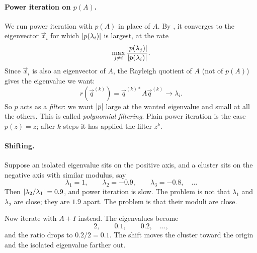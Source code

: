 \paragraph{Power iteration on \texorpdfstring{$p(A)$}{p(A)}.} We run power iteration with $p(A)$ in place of $A$. By , it converges to the eigenvector $\vec{x}_i$ for which $\left\lvert p(\lambda_i) \right\rvert$ is largest, at the rate
\begin{equation*}
  \max_{j \ne i}\frac{\left\lvert p(\lambda_j) \right\rvert}{\left\lvert p(\lambda_i) \right\rvert}.
\end{equation*}
Since $\vec{x}_i$ is also an eigenvector of $A$, the Rayleigh quotient of $A$ (not of $p(A)$) gives the eigenvalue we want:
\begin{equation*}
  r(\vec{q}^{(k)}) = \vec{q}^{(k)\ast}A\vec{q}^{(k)} \to \lambda_i.
\end{equation*}
So $p$ acts as a \emph{filter}: we want $\left\lvert p \right\rvert$ large at the wanted eigenvalue and small at all the others. This is called \emph{polynomial filtering}. Plain power iteration is the case $p(z) = z$; after $k$ steps it has applied the filter $z^k$.

\paragraph{Shifting.} Suppose an isolated eigenvalue sits on the positive axis, and a cluster sits on the negative axis with similar modulus, say
\begin{equation*}
  \lambda_1 = 1, \qquad \lambda_2 = -0.9, \qquad \lambda_3 = -0.8, \quad \dots
\end{equation*}
Then $\left\lvert \lambda_2/\lambda_1 \right\rvert = 0.9$, and power iteration is slow. The problem is not that $\lambda_1$ and $\lambda_2$ are close; they are $1.9$ apart. The problem is that their moduli are close.

Now iterate with $A + I$ instead. The eigenvalues become
\begin{equation*}
  2, \qquad 0.1, \qquad 0.2, \quad \dots,
\end{equation*}
and the ratio drops to $0.2/2 = 0.1$. The shift moves the cluster toward the origin and the isolated eigenvalue farther out.

